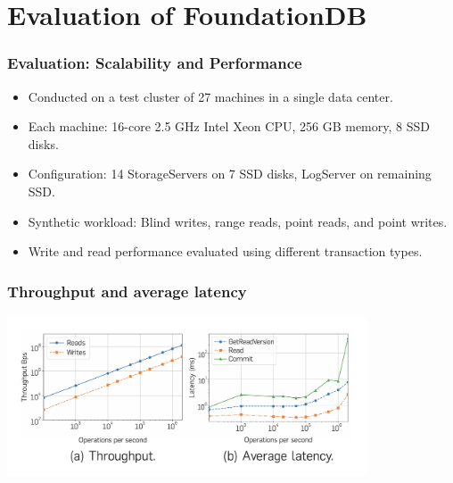 \section{Evaluation of FoundationDB}

\begin{frame}
    \frametitle{Evaluation: Scalability and Performance}
    \begin{itemize}
        \item Conducted on a test cluster of 27 machines in a single data center.
        \item Each machine: 16-core 2.5 GHz Intel Xeon CPU, 256 GB memory, 8 SSD disks.
        \item Configuration: 14 StorageServers on 7 SSD disks, LogServer on remaining SSD.
        \item Synthetic workload: Blind writes, range reads, point reads, and point writes.
        \item Write and read performance evaluated using different transaction types.
    \end{itemize}
\end{frame}
\begin{frame}
    \frametitle{Throughput and average latency}
    \begin{center}
        \includegraphics[width=0.8\textwidth]{img/4-Evaluation/Throughput-Average latency.png}
    \end{center}
\end{frame}

